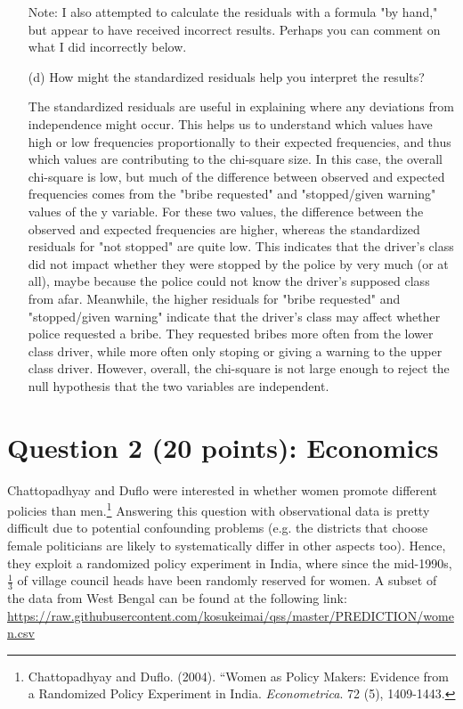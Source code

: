 \documentclass[12pt,letterpaper]{article}
\begin{document}
\begin{enumerate}
Note: I also attempted to calculate the residuals with a formula "by hand," but appear to have received incorrect results. Perhaps you can comment on what I did incorrectly below.



\vspace{1cm}

	\item [(d)] How might the standardized residuals help you interpret the results?
	\vspace{.2cm}

The standardized residuals are useful in explaining where any deviations from independence might occur. This helps us to understand which values have high or low frequencies proportionally to their expected frequencies, and thus which values are contributing to the chi-square size. In this case, the overall chi-square is low, but much of the difference between observed and expected frequencies comes from the "bribe requested" and "stopped/given warning" values of the y variable. For these two values, the difference between the observed and expected frequencies are higher, whereas the standardized residuals for "not stopped" are quite low. This indicates that the driver's class did not impact whether they were stopped by the police by very much (or at all), maybe because the police could not know the driver's supposed class from afar. Meanwhile, the higher residuals for "bribe requested" and "stopped/given warning" indicate that the driver's class may affect whether police requested a bribe. They requested bribes more often from the lower class driver, while more often only stoping or giving a warning to the upper class driver. However, overall, the chi-square is not large enough to reject the null hypothesis that the two variables are independent.
	
\end{enumerate}
\newpage

\section*{Question 2 (20 points): Economics}
Chattopadhyay and Duflo were interested in whether women promote different policies than men.\footnote{Chattopadhyay and Duflo. (2004). ``Women as Policy Makers: Evidence from a Randomized Policy Experiment in India. \textit{Econometrica}. 72 (5), 1409-1443.} Answering this question with observational data is pretty difficult due to potential confounding problems (e.g. the districts that choose female politicians are likely to systematically differ in other aspects too). Hence, they exploit a randomized policy experiment in India, where since the mid-1990s, $\frac{1}{3}$ of village council heads have been randomly reserved for women. A subset of the data from West Bengal can be found at the following link: \url{https://raw.githubusercontent.com/kosukeimai/qss/master/PREDICTION/women.csv}\\
\end{document}

